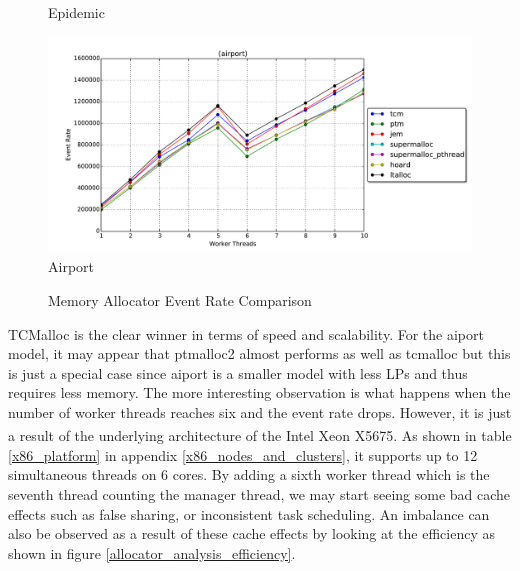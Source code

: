 \documentclass[11pt]{book}
\begin{document}
\begin{figure}
\begin{minipage}{.5\textwidth}
\begin{center}
      Epidemic \\
    \end{center}
  \end{minipage}%
  \begin{minipage}{.5\textwidth}
    \begin{center}
      \includegraphics[width=\textwidth,keepaspectratio,quiet]{figs/memory_allocation/airport_eventrate.pdf} \\
      Airport \\
    \end{center}
  \end{minipage}
  \caption{Memory Allocator Event Rate Comparison}\label{allocator_analysis_eventrate}
\end{figure}

TCMalloc is the clear winner in terms of speed and scalability.  For the aiport model, it may
appear that ptmalloc2 almost performs as well as tcmalloc but this is just a special case since
aiport is a smaller model with less LPs and thus requires less memory.  The more interesting
observation is what happens when the number of worker threads reaches six and the event rate
drops.  However, it is just a result of the underlying architecture of the
Intel\textsuperscript{\textregistered} Xeon\textsuperscript{\textregistered} X5675.  As shown in
table \ref{x86_platform} in appendix \ref{x86_nodes_and_clusters}, it supports up to 12 simultaneous
threads on 6 cores.  By adding a sixth worker thread which is the seventh thread counting the
manager thread, we may start seeing some bad cache effects such as false sharing, or inconsistent
task scheduling.  An imbalance can also be observed as a result of these cache effects by looking at
the efficiency as shown in figure \ref{allocator_analysis_efficiency}.
\end{document}
